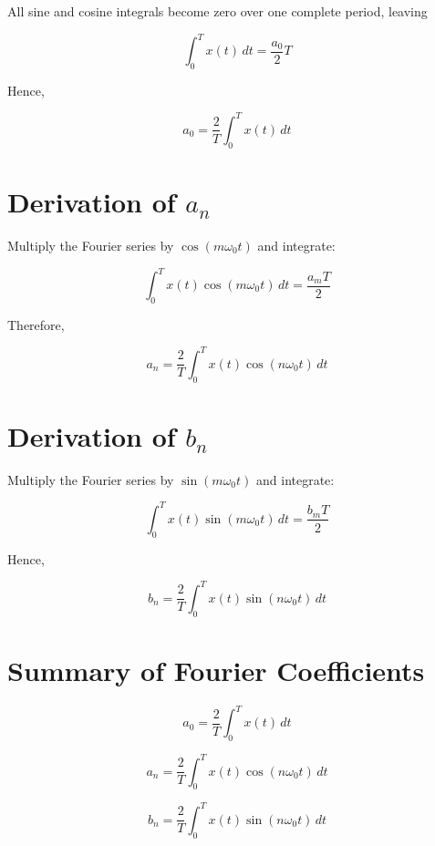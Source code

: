All sine and cosine integrals become zero over one complete period, leaving

\[
\int_0^T x(t)\,dt
=
\frac{a_0}{2}T
\]

Hence,

\[
\boxed{
a_0=\frac{2}{T}\int_0^T x(t)\,dt
}
\]


\section{Derivation of \(a_n\)}

Multiply the Fourier series by \(\cos(m\omega_0 t)\) and integrate:

\[
\int_0^T x(t)\cos(m\omega_0 t)\,dt
=
\frac{a_mT}{2}
\]

Therefore,

\[
\boxed{
a_n=
\frac{2}{T}
\int_0^T
x(t)\cos(n\omega_0 t)\,dt
}
\]


\section{Derivation of \(b_n\)}

Multiply the Fourier series by \(\sin(m\omega_0 t)\) and integrate:

\[
\int_0^T x(t)\sin(m\omega_0 t)\,dt
=
\frac{b_mT}{2}
\]

Hence,

\[
\boxed{
b_n=
\frac{2}{T}
\int_0^T
x(t)\sin(n\omega_0 t)\,dt
}
\]


\section{Summary of Fourier Coefficients}

\begin{tcolorbox}[title=Coefficient Formulas,colback=yellow!10]

\[
a_0=
\frac{2}{T}\int_0^T x(t)\,dt
\]

\[
a_n=
\frac{2}{T}
\int_0^T x(t)\cos(n\omega_0 t)\,dt
\]

\[
b_n=
\frac{2}{T}
\int_0^T x(t)\sin(n\omega_0 t)\,dt
\]

\end{tcolorbox}

